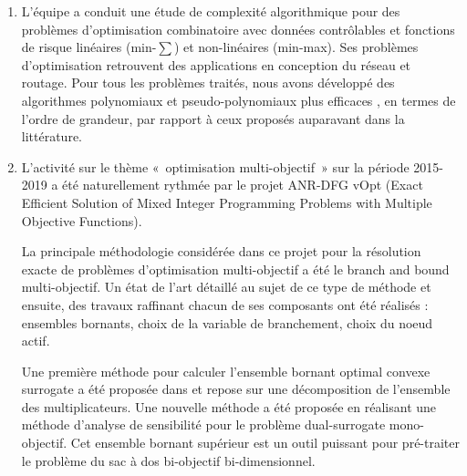 \begin{enumerate}
    \item L’équipe a conduit une étude de complexité algorithmique pour des problèmes d'optimisation combinatoire avec données contrôlables et fonctions de risque linéaires (min-$\sum$) et non-linéaires (min-max). Ses problèmes d’optimisation retrouvent des applications en conception du réseau et routage. Pour tous les problèmes traités, nous avons développé des algorithmes polynomiaux et pseudo-polynomiaux plus efficaces \cite{gurevsky:hal-01262639,gurevsky:hal-01272518,gurevsky:hal-01341259,gurevsky:hal-02504487}, en termes de l'ordre de grandeur, par rapport à ceux proposés auparavant dans la littérature. 
    
    \item L’activité sur le thème « optimisation multi-objectif » sur la période 2015-2019 a été naturellement rythmée par le projet ANR-DFG vOpt (Exact Efficient Solution of Mixed Integer Programming Problems with Multiple Objective Functions).


La principale méthodologie considérée dans ce projet pour la résolution exacte de problèmes d’optimisation multi-objectif a été le branch and bound multi-objectif. Un état de l’art détaillé au sujet de ce type de méthode \cite{przybylski:hal-01717951} et ensuite, des travaux raffinant chacun de ses composants ont été réalisés : ensembles bornants, choix de la variable de branchement, choix du noeud actif. 


Une première méthode pour calculer l’ensemble bornant optimal convexe surrogate a été proposée dans \cite{cerqueus:hal-011583} et repose sur une décomposition de l’ensemble des multiplicateurs. Une nouvelle méthode \cite{przybylski:hal-02480174} a été proposée en réalisant une méthode d’analyse de sensibilité pour le problème dual-surrogate mono-objectif. Cet ensemble bornant supérieur est un outil puissant pour pré-traiter le problème du sac à dos bi-objectif bi-dimensionnel.


\end{enumerate}

